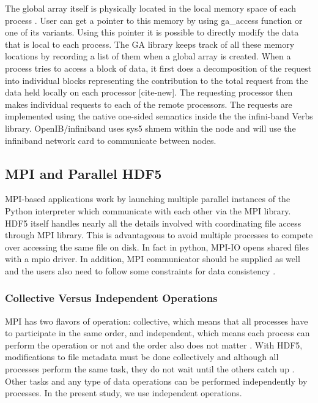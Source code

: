 The global array itself is physically located in the local memory space of each process \cite{GA}. 
User can get a pointer to this memory by using ga\_access function or one of its variants.
Using this pointer it is possible to directly modify the data that is local to each process. 
The GA library keeps track of all these memory locations by recording a list of them when a global array is created. 
When a process tries to access a block of data, it first does a decomposition of the request into individual blocks representing the contribution to the total request from the data held locally on each processor [cite-new]. 
The requesting processor then makes individual requests to each of the remote processors. 
The requests are implemented using the native one-sided semantics inside the the infini-band Verbs library. 
OpenIB/infiniband uses sys5 shmem within the node and will use the infiniband network card to communicate between nodes.

\subsection{MPI and Parallel HDF5}
MPI-based applications work by launching multiple parallel instances of the Python interpreter which communicate with each other via the MPI library. 
HDF5 itself handles nearly all the details involved with coordinating file access through MPI library.
This is advantageous to avoid multiple processes to compete over accessing the same file on disk. 
In fact in python, MPI-IO opens shared files with a mpio driver. 
In addition,  MPI communicator should be supplied as well and the users also need to follow some constraints for data consistency \cite{pythonhdf5}.

\subsubsection{Collective Versus Independent Operations} 
MPI has two flavors of operation: collective, which means that all processes have to participate in the same order, and independent, which means each process can perform the operation or not and the order also does not matter  \cite{pythonhdf5}.
With HDF5, modifications to file metadata must be done collectively and although all processes perform the same task, they do not wait until the others catch up \cite{pythonhdf5}. 
Other tasks and any type of data operations can be performed independently by processes.
In the present study, we use independent operations.



